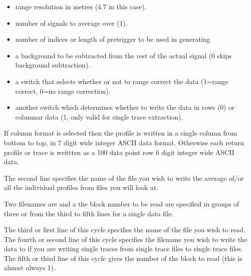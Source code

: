 \begin{itemize}
\item range resolution in metres (4.7 in this case).
\item number of signals to average over (1).
\item number of indices or length of pretrigger to be used in generating
\item a background to be subtracted from the rest of the actual signal
(0 skips background subtraction).
\item a switch that selects whether or not to range correct the data
(1=range correct, 0=no range correction).
\item another switch which determines whether to write the data in
rows (0) or columnar data (1, only valid for single trace extraction).
\end{itemize}


\noindent
If column format is selected then the profile is written in a single
column from bottom to top, in 7 digit wide integer ASCII data format. 
Otherwise  each return profile or trace is writtten as a 100 data point row 
6 digit integer wide ASCII data.


\noindent
The second line specifies the name of the file you wish to write the
average of/or all the individual profiles from files you will look at.


\noindent
Two filenames are and a the block number to be read are 
specified in groups of three or from the third to fifth lines
for a single data file.


\noindent
The third or first line of this cycle specifies the 
name of the file you wish to read.
The fourth or second line of this cycle specifies the 
filename you wish to write the data to if you are writing single
traces from single trace files to single trace files.
The fifth or third line of this cycle gives the number
of the block to read (this is almost always 1).
